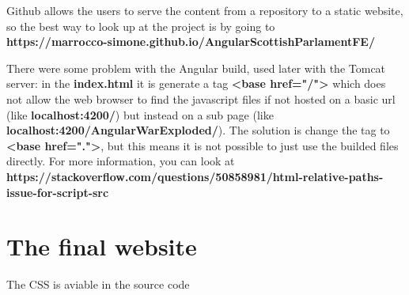 \documentclass[12pt, a4paper]{article}
\begin{document}
  Github allows the users to serve the content from a repository to a static website, so the best way to look up at the project is by going to \\
  \textbf{https://marrocco-simone.github.io/AngularScottishParlamentFE/}
  
  There were some problem with the Angular build, used later with the Tomcat server: in the \textbf{index.html} it is generate a tag \textbf{\textless base href="/"\textgreater} which does not allow the web browser to find the javascript files if not hosted on a basic url (like \textbf{localhost:4200/}) but instead on a sub page (like \textbf{localhost:4200/AngularWarExploded/}). The solution is change the tag to \textbf{\textless base href="."\textgreater}, but this means it is not possible to just use the builded files directly. For more information, you can look at \\
  \textbf{https://stackoverflow.com/questions/50858981/html-relative-paths-issue-for-script-src}

  \pagebreak
  \section{The final website}

  The CSS is aviable in the source code
\end{document}
